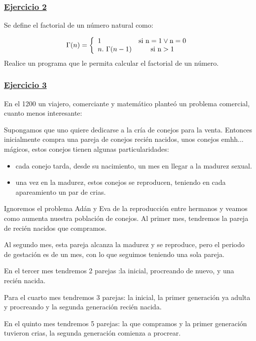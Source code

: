 \documentclass[a4paper,11pt]{article}
\theoremstyle{mytheor}
\begin{document}
\subsubsection*{\underline{Ejercicio 2}}
Se define el factorial de un número natural como:

\begin{equation*}
	\Gamma(n) = \left\lbrace
	\begin{array}{l c}
		1 								& \text{si } \text n =1 \vee  \text n =0\\
		n .\ \Gamma(n-1) 	& \text{si } \text n > 1 
	\end{array} \right.
\end{equation*}
Realice un programa que le permita calcular el factorial de un número.

\subsubsection*{\underline{Ejercicio 3}}

En el 1200 un viajero, comerciante y matemático planteó un problema comercial, cuanto menos interesante:

Supongamos que uno quiere dedicarse a la cría de conejos para la venta. Entonces inicialmente compra una pareja de conejos recién nacidos, unos conejos emhh... mágicos, estos conejos tienen algunas particularidades:
\begin{itemize}
\item cada conejo tarda, desde su nacimiento, un mes en llegar a la madurez sexual.
\item una vez en la madurez, estos conejos se reproducen, teniendo en cada apareamiento un par de crias.
\end{itemize}
Ignoremos el problema Adán y Eva de la reproducción entre hermanos y veamos como aumenta nuestra población de conejos. Al primer mes, tendremos la pareja de recién nacidos que compramos. 

Al segundo mes, esta pareja alcanza la madurez y se reproduce, pero el periodo de gestación es de un mes, con lo que seguimos teniendo una sola pareja. 

En el tercer mes tendremos 2 parejas :la inicial, procreando de nuevo, y una recién nacida. 

Para el cuarto mes tendremos 3 parejas: la inicial, la primer generación ya adulta y procreando y la segunda generación recién nacida.

En el quinto mes tendremos 5 parejas: la que compramos y la primer generación tuvieron crias, la segunda generación comienza a procrear.
\end{document}
